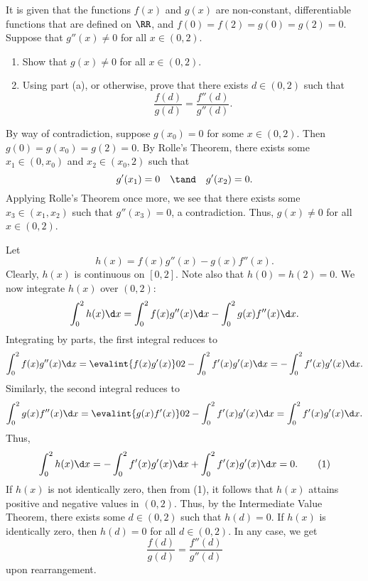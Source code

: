 \begin{problem}
    It is given that the functions $f(x)$ and $g(x)$ are non-constant, differentiable functions that are defined on $\RR$, and $f(0) = f(2) = g(0) = g(2) = 0$. Suppose that $g''(x) \neq 0$ for all $x \in (0, 2)$.

    \begin{enumerate}
        \item Show that $g(x) \neq 0$ for all $x \in (0, 2)$.
        \item Using part (a), or otherwise, prove that there exists $d \in (0, 2)$ such that \[\frac{f(d)}{g(d)} = \frac{f''(d)}{g''(d)}.\]
    \end{enumerate}
\end{problem}
\begin{solution}
    \begin{ppart}
        By way of contradiction, suppose $g(x_0) = 0$ for some $x \in (0, 2)$. Then $g(0) = g(x_0) = g(2) = 0$. By Rolle's Theorem, there exists some $x_1 \in (0, x_0)$ and $x_2 \in (x_0, 2)$ such that \[g'(x_1) = 0 \quad \tand \quad g'(x_2) = 0.\] Applying Rolle's Theorem once more, we see that there exists some $x_3 \in (x_1, x_2)$ such that $g''(x_3) = 0$, a contradiction. Thus, $g(x) \neq 0$ for all $x \in (0, 2)$.
    \end{ppart}
    \begin{ppart}
        Let \[h(x) = f(x)g''(x) - g(x)f''(x).\] Clearly, $h(x)$ is continuous on $[0,2]$. Note also that $h(0) = h(2) = 0$. We now integrate $h(x)$ over $(0, 2)$: \[\int_0^2 h(x) \d x = \int_0^2 f(x) g''(x) \d x - \int_0^2 g(x) f''(x) \d x.\] Integrating by parts, the first integral reduces to \[\int_0^2 f(x) g''(x) \d x = \evalint{f(x) g'(x)}02 - \int_0^2 f'(x) g'(x) \d x = - \int_0^2 f'(x) g'(x) \d x.\] Similarly, the second integral reduces to \[\int_0^2 g(x) f''(x) \d x = \evalint{g(x) f'(x)}02 - \int_0^2 f'(x) g'(x) \d x = \int_0^2 f'(x) g'(x) \d x.\] Thus, \[\int_0^2 h(x) \d x = - \int_0^2 f'(x) g'(x) \d x + \int_0^2 f'(x) g'(x) \d x = 0. \tag{1}\] If $h(x)$ is not identically zero, then from (1), it follows that $h(x)$ attains positive and negative values in $(0, 2)$. Thus, by the Intermediate Value Theorem, there exists some $d \in (0, 2)$ such that $h(d) = 0$. If $h(x)$ is identically zero, then $h(d) = 0$ for all $d \in (0, 2)$. In any case, we get \[\frac{f(d)}{g(d)} = \frac{f''(d)}{g''(d)}\] upon rearrangement.
    \end{ppart}
\end{solution}

